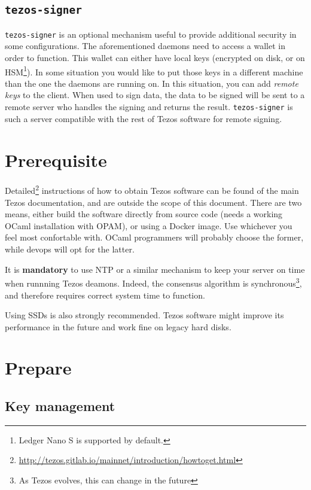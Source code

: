 \documentclass[a4paper,twocolumn,10pt]{article}
\begin{document}
\subsection{\texttt{tezos-signer}}

\texttt{tezos-signer} is an optional mechanism useful to provide
additional security in some configurations. The aforementioned daemons
need to access a wallet in order to function. This wallet can either
have local keys (encrypted on disk, or on HSM\footnote{Ledger Nano S
  is supported by default.}). In some situation you would like to put
those keys in a different machine than the one the daemons are running
on. In this situation, you can add \emph{remote keys} to the
client. When used to sign data, the data to be signed will be sent to
a remote server who handles the signing and returns the
result. \texttt{tezos-signer} is such a server compatible with the
rest of Tezos software for remote signing.

\section{Prerequisite}
Detailed\footnote{\url{http://tezos.gitlab.io/mainnet/introduction/howtoget.html}}
instructions of how to obtain Tezos software can be found of the main
Tezos documentation, and are outside the scope of this document. There
are two means, either build the software directly from source code
(needs a working OCaml installation with OPAM), or using a Docker
image. Use whichever you feel most confortable with. OCaml programmers
will probably choose the former, while devops will opt for the latter.

It is \textbf{mandatory} to use NTP or a similar mechanism to keep
your server on time when runnning Tezos deamons. Indeed, the consensus
algorithm is synchronous\footnote{As Tezos evolves, this can change in
  the future}, and therefore requires correct system time to function.

Using SSDs is also strongly recommended. Tezos software might improve
its performance in the future and work fine on legacy hard disks.


\section{Prepare}
\subsection{Key management}
\end{document}
